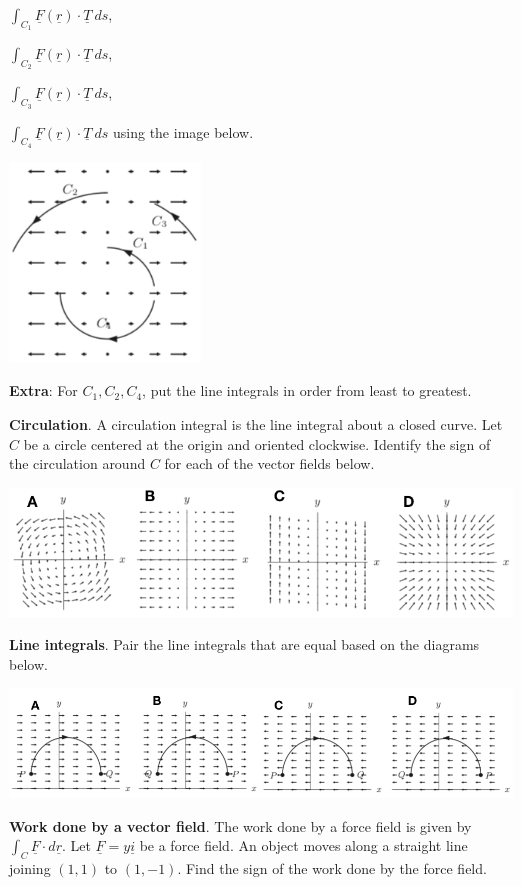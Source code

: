 \documentclass[12pt,letterpaper,noanswers]{exam}
\newcommand{\mb}[1]{\underline{#1}}
\begin{document}
$\displaystyle\int_{C_1} \mb F(\mb r)\cdot \mb T\ ds$,

$\displaystyle\int_{C_2} \mb F(\mb r)\cdot \mb T\ ds$,

$\displaystyle\int_{C_3} \mb F(\mb r)\cdot \mb T\ ds$,

$\displaystyle\int_{C_4} \mb F(\mb r)\cdot \mb T\ ds$ using the image below.


\includegraphics[width=2in]{img/C25p2-18.png}

\textbf{Extra}: For $C_1, C_2, C_4$, put the line integrals in order from least to greatest.


\vfill
\eject
\noindent\textbf{Circulation}.  A circulation integral is the line integral about a closed curve.  Let $C$ be a circle centered at the origin and oriented clockwise.  Identify the sign of the circulation around $C$ for each of the vector fields below.  

\includegraphics[width=\linewidth]{img/C25p4-18.png}
\vfill



\noindent\textbf{Line integrals}.  Pair the line integrals that are equal based on the diagrams below.

\includegraphics[width=\linewidth]{img/C25p5-18.png}

\vfill

\noindent\textbf{Work done by a vector field}.  The work done by a force field is given by $\int_C \mb F\cdot d\mb r$.  Let $\mb F = y\mb i$ be a force field.  An object moves along a straight line joining $(1,1)$ to $(1,-1)$.  Find the sign of the work done by the force field. %
\end{document}
